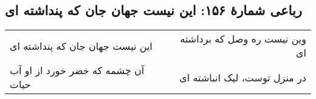 \begin{center}
\section*{رباعی شمارهٔ ۱۵۶: این نیست جهان جان که پنداشته ای}
\label{sec:156}
\begin{longtable}{l p{0.5cm} r}
این نیست جهان جان که پنداشته ای
&&
وین نیست ره وصل که برداشته ای
\\
آن چشمه که خضر خورد از او آب حیات
&&
در منزل توست، لیک انباشته ای
\\
\end{longtable}
\end{center}
